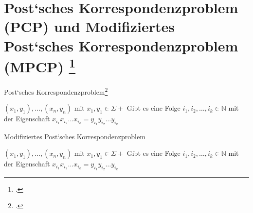 \documentclass{lehramt-informatik-aufgabe}
\begin{document}
\section{Post‘sches Korrespondenzproblem (PCP) und Modifiziertes Post‘sches Korrespondenzproblem (MPCP)
\footcite[Seite 46-48]{theo:fs:4}}

Post‘sches Korrespondenzproblem\footcite[Seite 326-330]{hoffmann}

{$(x_1, y_1), \dots, (x_n, y_n)$ mit $x_1, y_1 \in \Sigma +$}
{Gibt es eine Folge $i_1, i_2, \dots, i_k \in \mathbb{N}$ mit der Eigenschaft
$x_{i_1} x_{i_2} \dots x_{i_k} = y_{i_1} y_{i_2} \dots y_{i_k}$}

Modifiziertes Post‘sches Korrespondenzproblem

{$(x_1, y_1), \dots, (x_n, y_n)$ mit $x_1, y_1 \in \Sigma +$}
{Gibt es eine Folge $i_1, i_2, \dots, i_k \in \mathbb{N}$ mit der Eigenschaft
$x_{i_1} x_{i_2} \dots x_{i_k} = y_{i_1} y_{i_2} \dots y_{i_k}$}
\end{document}

